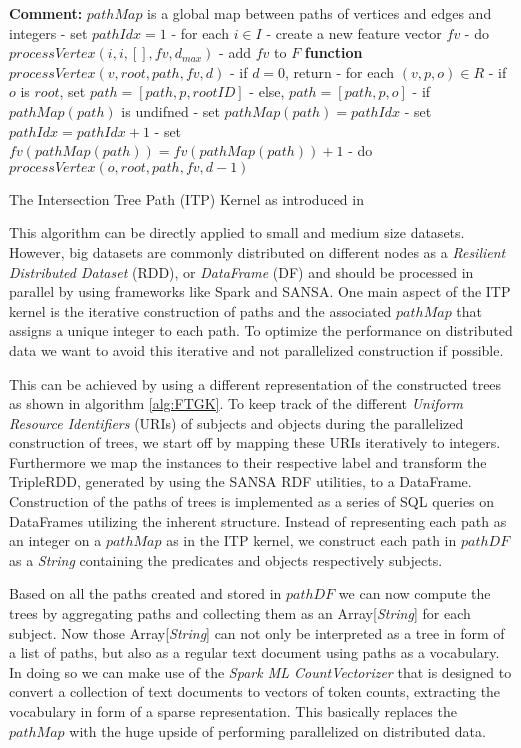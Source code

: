 \documentclass{easychair}
\begin{document}
\begin{algorithm}
 \label{alg:ITP}
 \textbf{Comment:} $pathMap$ is a global map between paths of vertices and edges and integers\;
 \;
 - set $pathIdx = 1$\;
 - for each $i \in I$\; \Indp
 - create a new feature vector $fv$\;
 - do $processVertex(i,i,[],fv,d_{max})$\;
 - add $fv$ to $F$\; \Indm
 \;
 \textbf{function} $processVertex(v,root,path,fv,d)$\; \Indp
 - if $d = 0$, return \;
 - for each $(v,p,o) \in R$\; \Indp
 - if $o$ is $root$, set $path = [path,p,rootID]$\;
 - else, $path = [path, p, o]$\;
 - if $pathMap(path)$ is undifned\; \Indp
 - set $pathMap(path) = pathIdx$
 - set$pathIdx = pathIdx + 1$\; \Indm
 - set $fv(pathMap(path)) = fv(pathMap(path)) + 1$\;
 - do $processVertex(o,root,path,fv,d-1)$\;
 \;
\caption{The Intersection Tree Path (ITP) Kernel as introduced in \cite{FGK}}
\end{algorithm}

This algorithm can be directly applied to small and medium size datasets. However, big datasets are commonly distributed on different nodes as a \textit{Resilient Distributed Dataset} (RDD), or \textit{DataFrame} (DF) \cite{RDDpaper} and should be processed in parallel by using frameworks like Spark and SANSA. One main aspect of the ITP kernel is the iterative construction of paths and the associated $pathMap$ that assigns a unique integer to each path. To optimize the performance on distributed data we want to avoid this iterative and not parallelized construction if possible.

This can be achieved by using a different representation of the constructed trees as shown in algorithm \ref{alg:FTGK}. To keep track of the different \textit{Uniform Resource Identifiers} (URIs) of subjects and objects during the parallelized construction of trees, we start off by mapping these URIs iteratively to integers. Furthermore we map the instances to their respective label and transform the TripleRDD, generated by using the SANSA RDF utilities, to a DataFrame. Construction of the paths of trees is implemented as a series of SQL queries on DataFrames utilizing the inherent structure. Instead of representing each path as an integer on a $pathMap$ as in the ITP kernel, we construct each path in $pathDF$ as a \textit{String} containing the predicates and objects respectively subjects.

Based on all the paths created and stored in $pathDF$ we can now compute the trees by aggregating paths and collecting them as an Array[\textit{String}] for each subject. Now those Array[\textit{String}] can not only be interpreted as a tree in form of a list of paths, but also as a regular text document using paths as a vocabulary.  In doing so we can make use of the \textit{Spark ML CountVectorizer} that is designed to convert a collection of text documents to vectors of token counts, extracting the vocabulary in form of a sparse representation. This basically replaces the $pathMap$ with the huge upside of performing parallelized on distributed data. 
\end{document}

